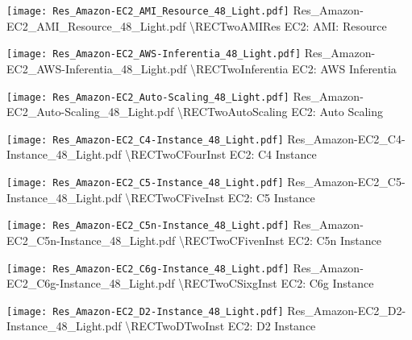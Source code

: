  {\texttt{[image: Res\_Amazon-EC2\_AMI\_Resource\_48\_Light.pdf]}} {Res\_Amazon-EC2\_AMI\_Resource\_48\_Light.pdf} {{\textbackslash}RECTwoAMIRes} {EC2: AMI: Resource}

 {\texttt{[image: Res\_Amazon-EC2\_AWS-Inferentia\_48\_Light.pdf]}} {Res\_Amazon-EC2\_AWS-Inferentia\_48\_Light.pdf} {{\textbackslash}RECTwoInferentia} {EC2: AWS Inferentia}

 {\texttt{[image: Res\_Amazon-EC2\_Auto-Scaling\_48\_Light.pdf]}} {Res\_Amazon-EC2\_Auto-Scaling\_48\_Light.pdf} {{\textbackslash}RECTwoAutoScaling} {EC2: Auto Scaling}

 {\texttt{[image: Res\_Amazon-EC2\_C4-Instance\_48\_Light.pdf]}} {Res\_Amazon-EC2\_C4-Instance\_48\_Light.pdf} {{\textbackslash}RECTwoCFourInst} {EC2: C4 Instance}

 {\texttt{[image: Res\_Amazon-EC2\_C5-Instance\_48\_Light.pdf]}} {Res\_Amazon-EC2\_C5-Instance\_48\_Light.pdf} {{\textbackslash}RECTwoCFiveInst} {EC2: C5 Instance}

 {\texttt{[image: Res\_Amazon-EC2\_C5n-Instance\_48\_Light.pdf]}} {Res\_Amazon-EC2\_C5n-Instance\_48\_Light.pdf} {{\textbackslash}RECTwoCFivenInst} {EC2: C5n Instance}

 {\texttt{[image: Res\_Amazon-EC2\_C6g-Instance\_48\_Light.pdf]}} {Res\_Amazon-EC2\_C6g-Instance\_48\_Light.pdf} {{\textbackslash}RECTwoCSixgInst} {EC2: C6g Instance}

 {\texttt{[image: Res\_Amazon-EC2\_D2-Instance\_48\_Light.pdf]}} {Res\_Amazon-EC2\_D2-Instance\_48\_Light.pdf} {{\textbackslash}RECTwoDTwoInst} {EC2: D2 Instance}

